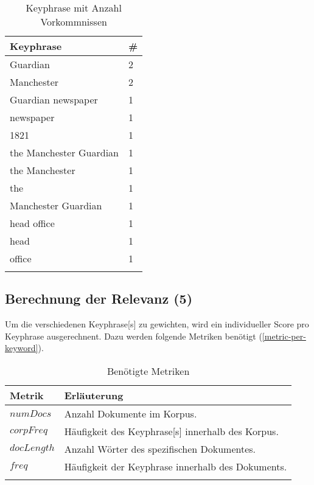 \begin{longtable}{|p{4cm}| p{1cm}|}
  \hline
    \gls{Keyphrase} & \#\\\hline
    Guardian & 2  \\\hline
    Manchester & 2  \\\hline
    Guardian newspaper & 1  \\\hline
    newspaper & 1  \\\hline
    1821 & 1  \\\hline
    the Manchester Guardian & 1  \\\hline
    the Manchester & 1  \\\hline
    the & 1  \\\hline
    Manchester Guardian & 1  \\\hline
    head office & 1  \\\hline
    head & 1  \\\hline
    office & 1  \\\hline
        \caption{Keyphrase mit Anzahl Vorkommnissen}
    \label{keyword-with-count}
\end{longtable}



\subsection{Berechnung der Relevanz (5)}\label{calcrelevance}


Um die verschiedenen \gls{Keyphrase}[s] zu gewichten, wird ein individueller \gls{Score} pro \gls{Keyphrase} ausgerechnent. Dazu werden folgende Metriken benötigt (\autoref{metric-per-keyword}).

\begin{longtable}{|p{2cm}| p{8cm}|}
  \hline
    Metrik & Erläuterung\\\hline
    $numDocs$ & Anzahl Dokumente im Korpus. \\\hline
    $corpFreq$ & Häufigkeit des \gls{Keyphrase}[s] innerhalb des Korpus. \\\hline
    $docLength$ & Anzahl Wörter des spezifischen Dokumentes. \\\hline
    $freq$ & Häufigkeit der \gls{Keyphrase} innerhalb des Dokuments. \\\hline
    \caption{Benötigte Metriken}
    \label{metric-per-keyword}
\end{longtable}


